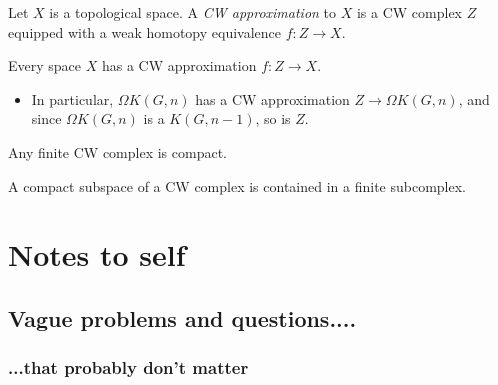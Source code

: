 \documentclass{MetricNotes2023}
\begin{document}
\begin{definition}
Let \(X\) is a topological space. A \textit{CW approximation} to \(X\) is a CW complex \(Z\) equipped with a weak homotopy equivalence \(f : Z \to X\).
\end{definition}

\begin{theorem}
Every space \(X\) has a CW approximation \(f : Z \to X\). %
\end{theorem}

\begin{itemize}
\item In particular, \(\Omega K(G, n)\) has a CW approximation \(Z \to \Omega K(G, n)\), and since \(\Omega K(G,n)\) is a \(K(G,n-1)\), so is \(Z\). 
\end{itemize}

Any finite CW complex is compact.

\begin{proposition}\label{25004081110}
A compact subspace of a CW complex is contained in a finite subcomplex.
\end{proposition}

\section{Notes to self}\label{C}

\subsection{Vague problems and questions....}

\subsubsection{...that probably don't matter}
\end{document}
